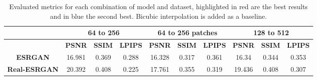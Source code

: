 \begin{table}[H]
  \caption{Evaluated metrics for each combination of model and dataset, highlighted in red are the best results and in blue the second best. Bicubic interpolation is added as a baseline.}
  \label{tab:metrics}
  \begin{tabular}{c|ccc|ccc|ccc|}
  \cline{2-10}
  \rowcolor[HTML]{C0C0C0}
  \cellcolor[HTML]{FFFFFF}                                                                       & \multicolumn{3}{c|}{\cellcolor[HTML]{C0C0C0}\textbf{64 to 256}}                                                                                        & \multicolumn{3}{c|}{\cellcolor[HTML]{C0C0C0}\textbf{64 to 256 patches}}                                                                                & \multicolumn{3}{c|}{\cellcolor[HTML]{C0C0C0}\textbf{128 to 512}}                                                                                       \\ \hline
  \rowcolor[HTML]{C0C0C0}
  \multicolumn{1}{|c|}{\cellcolor[HTML]{C0C0C0}\textbf{Model}}                                   & \multicolumn{1}{c|}{\cellcolor[HTML]{C0C0C0}\textbf{PSNR}} & \multicolumn{1}{c|}{\cellcolor[HTML]{C0C0C0}\textbf{SSIM}} & \textbf{LPIPS}               & \multicolumn{1}{c|}{\cellcolor[HTML]{C0C0C0}\textbf{PSNR}} & \multicolumn{1}{c|}{\cellcolor[HTML]{C0C0C0}\textbf{SSIM}} & \textbf{LPIPS}               & \multicolumn{1}{c|}{\cellcolor[HTML]{C0C0C0}\textbf{PSNR}} & \multicolumn{1}{c|}{\cellcolor[HTML]{C0C0C0}\textbf{SSIM}} & \textbf{LPIPS}               \\ \hline
  \multicolumn{1}{|c|}{\textbf{ESRGAN}}                                                          & \multicolumn{1}{c|}{16.981}                                & \multicolumn{1}{c|}{0.369}                                 & {\color[HTML]{3531FF} 0.288} & \multicolumn{1}{c|}{16.328}                                & \multicolumn{1}{c|}{0.317}                                 & {\color[HTML]{3531FF} 0.361} & \multicolumn{1}{c|}{16.34}                                 & \multicolumn{1}{c|}{0.344}                                 & {\color[HTML]{3531FF} 0.353} \\ \hline
  \multicolumn{1}{|c|}{\textbf{Real-ESRGAN}}                                                     & \multicolumn{1}{c|}{20.392}                                & \multicolumn{1}{c|}{0.408}                                 & {\color[HTML]{FE0000} 0.225} & \multicolumn{1}{c|}{17.761}                                & \multicolumn{1}{c|}{0.355}                                 & {\color[HTML]{FE0000} 0.319} & \multicolumn{1}{c|}{{\color[HTML]{3531FF} 19.436}}         & \multicolumn{1}{c|}{{\color[HTML]{3531FF} 0.408}}          & {\color[HTML]{FE0000} 0.307} \\ \hline

\end{tabular}
\end{table}
